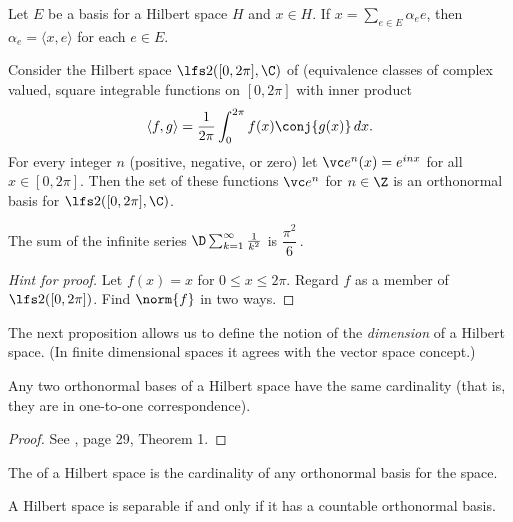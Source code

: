 \begin{prop}\label{prop_unique_onbasis} Let $E$ be a basis for a Hilbert space $H$ and $x \in H$. 
If $x = \sum_{e \in E} \alpha_e e$, then $\alpha_e = \langle x,e \rangle$ for each $e \in E$.
\end{prop}

\begin{prop} Consider the Hilbert space $\lfs 2([0,2\pi],\C)$ of (equivalence classes of complex valued,
square integrable functions on $[0,2\pi]$ with inner product
  \[ \langle f,g \rangle = \frac1{2\pi}\int_0^{2\pi} f(x) \conj{g(x)}\,dx. \]
For every integer $n$ (positive, negative, or zero) let $\vc e^n(x) = e^{inx}$ for all $x
\in [0,2\pi]$.  Then the set of these functions $\vc e^n$ for $n \in \Z$ is an
orthonormal basis for $\lfs 2([0,2\pi],\C)$.
\end{prop}

\begin{exam} The sum of the infinite series $\D\sum_{k=1}^\infty \frac1{k^2}$ is $\dfrac{\pi^2}6$\,.
\end{exam}

\begin{proof}[\emph{Hint for proof}]   Let $f(x) = x$ for $0 \le x \le 2\pi$.  Regard $f$ as a member of
$\lfs 2([0,2\pi])$.  Find $\norm{f}$ in two ways.  \ns
\end{proof}

The next proposition allows us to define the notion of the \emph{dimension} of a Hilbert space.  (In finite dimensional
spaces it agrees with the vector space concept.)

\begin{prop} Any two orthonormal bases of a Hilbert space have the same cardinality (that is, they are in
one-to-one correspondence).
\end{prop}

\begin{proof}  See \cite{Halmos:1951}, page 29, Theorem 1.   \ns
\end{proof}

\begin{defn} The
 of a Hilbert space is the cardinality of any orthonormal basis for the space.
\end{defn}

\begin{prop}\label{prop_Schauder_basis_Hsp} A Hilbert space is separable if and only if it has a
countable orthonormal basis.
\end{prop}

